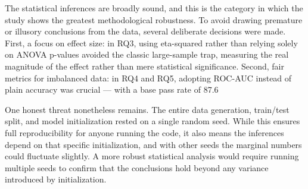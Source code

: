 The statistical inferences are broadly sound, and this is the category in which the study shows the greatest methodological robustness. To avoid drawing premature or illusory conclusions from the data, several deliberate decisions were made. First, a focus on effect size: in RQ3, using eta-squared rather than relying solely on ANOVA p-values avoided the classic large-sample trap, measuring the real magnitude of the effect rather than mere statistical significance. Second, fair metrics for imbalanced data: in RQ4 and RQ5, adopting ROC-AUC instead of plain accuracy was crucial — with a base pass rate of 87.6%

One honest threat nonetheless remains. The entire data generation, train/test split, and model initialization rested on a single random seed. While this ensures full reproducibility for anyone running the code, it also means the inferences depend on that specific initialization, and with other seeds the marginal numbers could fluctuate slightly. A more robust statistical analysis would require running multiple seeds to confirm that the conclusions hold beyond any variance introduced by initialization.
